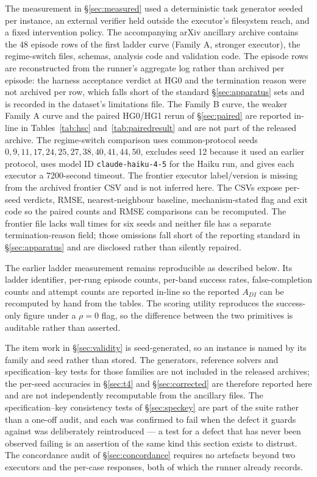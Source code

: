 \documentclass[11pt]{article}
\theoremstyle{definition}
\begin{document}
The measurement in \S\ref{sec:measured} used a deterministic task generator seeded per instance, an external verifier held outside the executor's filesystem reach, and a fixed intervention policy. The accompanying arXiv ancillary archive  contains the 48 episode rows of the first ladder curve (Family A, stronger executor), the regime-switch files, schemas, analysis code and validation code. The episode rows are reconstructed from the runner's aggregate log rather than archived per episode: the harness acceptance verdict at HG0 and the termination reason were not archived per row, which falls short of the standard \S\ref{sec:apparatus} sets and is recorded in the dataset's limitations file. The Family B curve, the weaker Family A curve and the paired HG0/HG1 rerun of \S\ref{sec:paired} are reported in-line in Tables~\ref{tab:hsc} and~\ref{tab:pairedresult} and are not part of the released archive. The regime-switch comparison uses common-protocol seeds $0,9,11,17,24,25,27,38,40,41,44,50$, excludes seed 12 because it used an earlier protocol, uses model ID \texttt{claude-haiku-4-5} for the Haiku run, and gives each executor a 7200-second timeout. The frontier executor label/version is missing from the archived frontier CSV and is not inferred here. The CSVs expose per-seed verdicts, RMSE, nearest-neighbour baseline, mechanism-stated flag and exit code so the paired counts and RMSE comparisons can be recomputed. The frontier file lacks wall times for six seeds and neither file has a separate termination-reason field; those omissions fall short of the reporting standard in \S\ref{sec:apparatus} and are disclosed rather than silently repaired.

The earlier ladder measurement remains reproducible as described below. Its ladder identifier, per-rung episode counts, per-band success rates, false-completion counts and attempt counts are reported in-line so the reported $A_{DI}$ can be recomputed by hand from the tables. The scoring utility reproduces the success-only figure under a $\rho = 0$ flag, so the difference between the two primitives is auditable rather than asserted.

The item work in \S\ref{sec:validity} is seed-generated, so an instance is named by its family and seed rather than stored. The generators, reference solvers and specification--key tests for those families are not included in the released archives; the per-seed accuracies in \S\ref{sec:t4} and \S\ref{sec:corrected} are therefore reported here and are not independently recomputable from the ancillary files. The specification--key consistency tests of \S\ref{sec:speckey} are part of the suite rather than a one-off audit, and each was confirmed to fail when the defect it guards against was deliberately reintroduced --- a test for a defect that has never been observed failing is an assertion of the same kind this section exists to distrust. The concordance audit of \S\ref{sec:concordance} requires no artefacts beyond two executors and the per-case responses, both of which the runner already records.
\end{document}
